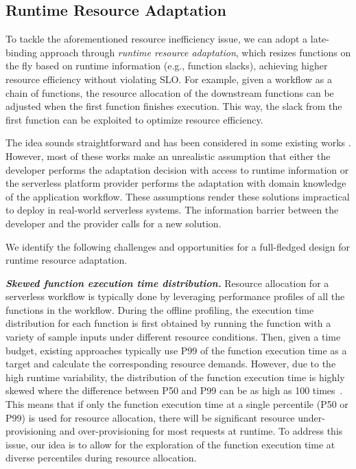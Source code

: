 



\subsection{Runtime Resource Adaptation}
\label{sec:bg:adaptive-allocation}
To tackle the aforementioned resource inefficiency issue, we can adopt a late-binding approach through \emph{runtime resource adaptation}, which resizes functions on the fly based on runtime information (e.g., function slacks), achieving higher resource efficiency without violating SLO. For example, given a workflow as a chain of functions, the resource allocation of the downstream functions can be adjusted when the first function finishes execution. This way, the slack from the first function can be exploited to optimize resource efficiency. 

The idea sounds straightforward and has been considered in some existing works \cite{infocom22-stepconf,middleware20-fifer,socc21-llama,socc21-kraken,middleware20-xanadu}.
However, most of these works make an unrealistic assumption that either the developer performs the adaptation decision with access to runtime information or the serverless platform provider performs the adaptation with domain knowledge of the application workflow. These assumptions render these solutions impractical to deploy in real-world serverless systems. The information barrier between the developer and the provider calls for a new solution. 

We identify the following challenges and opportunities for a full-fledged design for runtime resource adaptation. 

\textbf{\textit{Skewed function execution time distribution.}} 
Resource allocation for a serverless workflow is typically done by leveraging performance profiles of all the functions in the workflow. 
During the offline profiling, the execution time distribution for each function is first obtained by running the function with a variety of sample inputs under different resource conditions. Then, given a time budget, existing approaches typically use P99 of the function execution time as a target and calculate the corresponding resource demands. However, due to the high runtime variability, the distribution of the function execution time is highly skewed where the difference between P50 and P99 can be as high as 100 times~\cite{socc23-huawei-cloud}. This means that if only the function execution time at a single percentile (P50 or P99) is used for resource allocation, there will be significant resource under-provisioning and over-provisioning for most requests at runtime. To address this issue, our idea is to allow for the exploration of the function execution time at diverse percentiles during resource allocation. 


